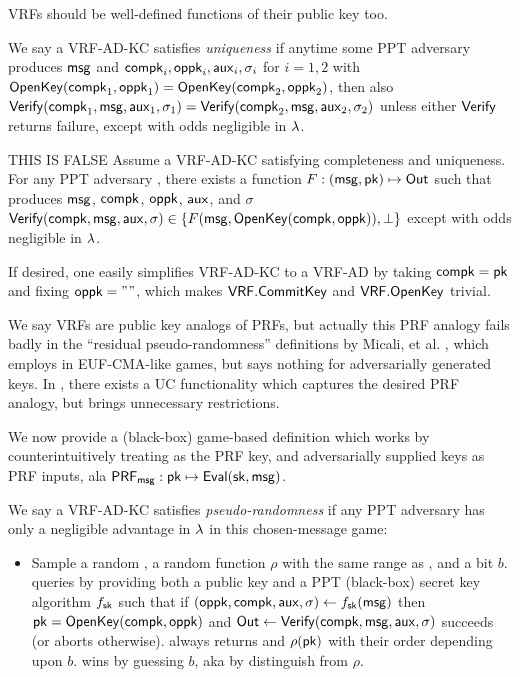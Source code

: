 VRFs should be well-defined functions of their public key too.

\begin{definition}
We say a VRF-AD-KC satisfies {\em uniqueness} if anytime some PPT adversary \adv
produces $\mathsf{msg}$ and $\mathsf{compk}_i,\mathsf{oppk}_i,\mathsf{aux}_i,\sigma_i$ for $i=1,2$
 with ${\mathsf{OpenKey}}(\mathsf{compk}_1,\mathsf{oppk}_1) = {\mathsf{OpenKey}}(\mathsf{compk}_2,\mathsf{oppk}_2)$, then also
${\mathsf{Verify}}(\mathsf{compk}_1,\mathsf{msg},\mathsf{aux}_1,\sigma_1) = {\mathsf{Verify}}(\mathsf{compk}_2,\mathsf{msg},\mathsf{aux}_2,\sigma_2)$
unless either ${\mathsf{Verify}}$ returns failure,
except with odds negligible in $\lambda$.
\end{definition}

\begin{lemma}
THIS IS FALSE
Assume a VRF-AD-KC satisfying completeness and uniqueness.
For any PPT adversary \adv,
there exists a function $F : (\mathsf{msg},\mathsf{pk}) \mapsto {\ensuremath{\mathsf{Out}}}$ such that
\adv produces $\mathsf{msg}$, $\mathsf{compk}$, $\mathsf{oppk}$, $\mathsf{aux}$, and $\sigma$
${\mathsf{Verify}}(\mathsf{compk},\mathsf{msg},\mathsf{aux},\sigma) \in \{ F(\mathsf{msg},{\mathsf{OpenKey}}(\mathsf{compk},\mathsf{oppk})), \perp \}$
except with odds negligible in $\lambda$.
\end{lemma}



If desired, one easily simplifies VRF-AD-KC to a VRF-AD by
 taking $\mathsf{compk} = \mathsf{pk}$ and fixing $\mathsf{oppk} = \mathtt{""}$,
 which makes ${\mathsf{VRF}}.{\mathsf{CommitKey}}$ and ${\mathsf{VRF}}.{\mathsf{OpenKey}}$ trivial.

\smallskip

We say VRFs are public key analogs of PRFs, but actually this PRF analogy
fails badly in the ``residual pseudo-randomness'' definitions by
Micali, et al. \cite{vrf_micali}, which employs  in EUF-CMA-like
games, but says nothing for adversarially generated keys.
%
In \cite{praos}, there exists a UC functionality which captures the
desired PRF analogy, but brings unnecessary restrictions.

We now provide a (black-box) game-based definition which works by
counterintuitively treating \msg as the PRF key, and adversarially
supplied keys as PRF inputs, ala ${\mathsf{PRF}}_\mathsf{msg} : \mathsf{pk} \mapsto {\ensuremath{\mathsf{Eval}}}(\mathsf{sk},\mathsf{msg})$.

\begin{definition}
We say a VRF-AD-KC satisfies {\em pseudo-randomness} if 
any PPT adversary \adv has only a negligible advantage in $\lambda$
in this chosen-message game:
\begin{itemize}
\item[]
 Sample a random \msg, a random function $\rho$ with the same range as \Eval, and a bit $b$.
 \adv queries  by providing both a public key \pk and
 a PPT (black-box) secret key algorithm $f_\mathsf{sk}$ such that
 if $(\mathsf{oppk},\mathsf{compk},\mathsf{aux},\sigma) \leftarrow f_\mathsf{sk}(\mathsf{msg})$ then
 $\mathsf{pk} = {\mathsf{OpenKey}}(\mathsf{compk},\mathsf{oppk})$ and
 ${\mathsf{Out}} \leftarrow {\ensuremath{\mathsf{Verify}}}(\mathsf{compk},\mathsf{msg},\mathsf{aux},\sigma)$ succeeds (or aborts otherwise).
  always returns \Out and $\rho(\mathsf{pk})$ with their order depending upon $b$.
 \adv wins by guessing $b$, aka by distinguish \Verify from $\rho$.
\end{itemize}
\end{definition}

